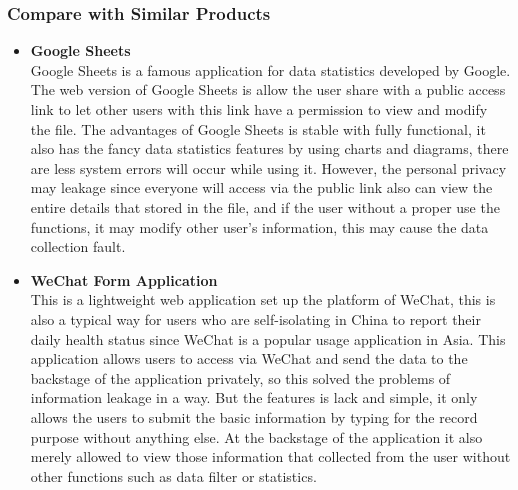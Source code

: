 \documentclass[12pt]{article}
\begin{document}
\subsubsection{Compare with Similar Products}
\begin{itemize}
\item\textbf{Google Sheets}
\\Google Sheets is a famous application for data statistics developed by Google. The web version of Google Sheets is allow the user share with a public access link to let other users with this link have a permission to view and modify the file. The advantages of Google Sheets is stable with fully functional, it also has the fancy data statistics features by using charts and diagrams, there are less system errors will occur while using it. However, the personal privacy may leakage since everyone will access via the public link also can view the entire details that stored in the file, and if the user without a proper use the functions, it may modify other user's information, this may cause the data collection fault.
\item\textbf{WeChat Form Application}
\\This is a lightweight web application set up the platform of WeChat, this is also a typical way for users who are self-isolating in China to report their daily health status since WeChat is a popular usage application in Asia. This application allows users to access via WeChat and send the data to the backstage of the application privately, so this solved the problems of information leakage in a way.  But the features is lack and simple, it only allows the users to submit the basic information by typing for the record purpose without anything else. At the backstage of the application it also merely allowed to view those information that collected from the user without other functions such as data filter or statistics.
\end{itemize}
\end{document}
